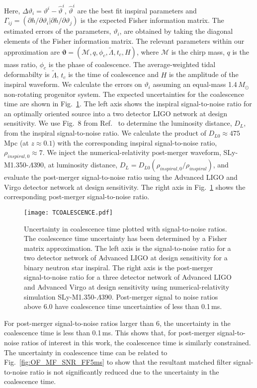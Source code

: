 \documentclass[../Thesis.tex]{subfiles}
\begin{document}
    \sloppy Here, $\Delta \vartheta_i = \vartheta^i-\hat{\vartheta}^i$, $\hat{\vartheta}^i$ are the best fit inspiral parameters and $\Gamma_{ij} = (\partial h/ \partial \vartheta_i | \partial h/ \partial \vartheta_j)$ is the expected Fisher information matrix. 
    The estimated errors of the parameters, $\vartheta_i$, are obtained by taking the diagonal elements of the Fisher information matrix. 
    The relevant parameters within our approximation are $\boldsymbol{\vartheta} = (\mathcal{M}, q, \phi_c, \tilde{\Lambda}, t_c,H)$, where $\mathcal{M}$ is the chirp mass, $q$ is the mass ratio, $\phi_c$ is the phase of coalescence.
    The average-weighted tidal deformabilty is  $\tilde{\Lambda}$, $t_c$ is the time of coalescence and $H$ is the amplitude of the inspiral waveform.
    We calculate the errors on $\vartheta_i$ assuming an equal-mass 1.4\,$M_\odot$ non-rotating progenitor system. 
    The expected uncertainties for the coalescence time are shown in  Fig.~\ref{fig:TCOALESCENCE}. 
    The left axis shows the inspiral signal-to-noise ratio for an optimally oriented source into a two detector LIGO network at design sensitivity.
    We use Fig.~8 from Ref.~\cite{Martynov2019} to determine the luminosity distance, $D_L$, from the inspiral signal-to-noise ratio. 
    We calculate the product of $D_{L0}\approx 475$\,Mpc (at $z\approx 0.1$) with the corresponding inspiral signal-to-noise ratio, $\rho_{inspiral,0}\approx 7$.
    We inject the numerical-relativity post-merger waveform, SLy-M1.350-$\Lambda$390, at luminosity distance, $D_L = D_{L0}\left(\rho_{inspiral,0}/\rho_{inspiral}\right)$, and evaluate the post-merger signal-to-noise ratio using the Advanced LIGO and Virgo detector network at design sensitivity.
    The right axis in  Fig.~\ref{fig:TCOALESCENCE} shows the corresponding post-merger signal-to-noise ratio.\par
    \begin{figure}[H]
         \centering
         \texttt{[image: TCOALESCENCE.pdf]}
         \caption{Uncertainty in coalescence time plotted with signal-to-noise ratios. The coalescence time uncertainty has been determined by a Fisher matrix approximation. The left axis is the signal-to-noise ratio for a two detector network of Advanced LIGO at design sensitivity for a binary neutron star inspiral. The right axis is the post-merger signal-to-noise ratio for a three detector network of Advanced LIGO and Advanced Virgo at design sensitivity using numerical-relativity simulation SLy-M1.350-$\Lambda$390. Post-merger signal to noise ratios above 6.0 have coalescence time uncertainties of less than 0.1\,ms.}
         \label{fig:TCOALESCENCE}
     \end{figure}  
    For post-merger signal-to-noise ratios larger than 6, the uncertainty in the coalescence time is less than 0.1\,ms.
    This shows that, for post-merger signal-to-noise ratios of interest in this work, the coalescence time is similarly constrained. 
    The uncertainty in coalescence time can be related to Fig.~\ref{fig:OF_MF_SNR_FF5ms} to show that the resultant matched filter signal-to-noise ratio is not significantly reduced due to the uncertainty in the coalescence time.
\end{document}
